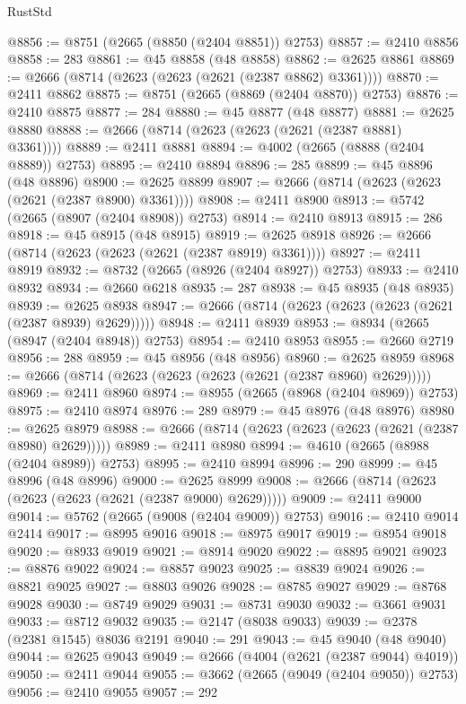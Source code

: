 \begin{lexlean}{RustStd}
\begin{coremodule}
@8856 := @8751 (@2665 (@8850 (@2404 @8851)) @2753)
@8857 := @2410 @8856
@8858 := 283
@8861 := @45 @8858 (@48 @8858)
@8862 := @2625 @8861
@8869 := @2666 (@8714 (@2623 (@2623 (@2621 (@2387 @8862) @3361))))
@8870 := @2411 @8862
@8875 := @8751 (@2665 (@8869 (@2404 @8870)) @2753)
@8876 := @2410 @8875
@8877 := 284
@8880 := @45 @8877 (@48 @8877)
@8881 := @2625 @8880
@8888 := @2666 (@8714 (@2623 (@2623 (@2621 (@2387 @8881) @3361))))
@8889 := @2411 @8881
@8894 := @4002 (@2665 (@8888 (@2404 @8889)) @2753)
@8895 := @2410 @8894
@8896 := 285
@8899 := @45 @8896 (@48 @8896)
@8900 := @2625 @8899
@8907 := @2666 (@8714 (@2623 (@2623 (@2621 (@2387 @8900) @3361))))
@8908 := @2411 @8900
@8913 := @5742 (@2665 (@8907 (@2404 @8908)) @2753)
@8914 := @2410 @8913
@8915 := 286
@8918 := @45 @8915 (@48 @8915)
@8919 := @2625 @8918
@8926 := @2666 (@8714 (@2623 (@2623 (@2621 (@2387 @8919) @3361))))
@8927 := @2411 @8919
@8932 := @8732 (@2665 (@8926 (@2404 @8927)) @2753)
@8933 := @2410 @8932
@8934 := @2660 @6218
@8935 := 287
@8938 := @45 @8935 (@48 @8935)
@8939 := @2625 @8938
@8947 := @2666 (@8714 (@2623 (@2623 (@2623 (@2621 (@2387 @8939) @2629)))))
@8948 := @2411 @8939
@8953 := @8934 (@2665 (@8947 (@2404 @8948)) @2753)
@8954 := @2410 @8953
@8955 := @2660 @2719
@8956 := 288
@8959 := @45 @8956 (@48 @8956)
@8960 := @2625 @8959
@8968 := @2666 (@8714 (@2623 (@2623 (@2623 (@2621 (@2387 @8960) @2629)))))
@8969 := @2411 @8960
@8974 := @8955 (@2665 (@8968 (@2404 @8969)) @2753)
@8975 := @2410 @8974
@8976 := 289
@8979 := @45 @8976 (@48 @8976)
@8980 := @2625 @8979
@8988 := @2666 (@8714 (@2623 (@2623 (@2623 (@2621 (@2387 @8980) @2629)))))
@8989 := @2411 @8980
@8994 := @4610 (@2665 (@8988 (@2404 @8989)) @2753)
@8995 := @2410 @8994
@8996 := 290
@8999 := @45 @8996 (@48 @8996)
@9000 := @2625 @8999
@9008 := @2666 (@8714 (@2623 (@2623 (@2623 (@2621 (@2387 @9000) @2629)))))
@9009 := @2411 @9000
@9014 := @5762 (@2665 (@9008 (@2404 @9009)) @2753)
@9016 := @2410 @9014 @2414
@9017 := @8995 @9016
@9018 := @8975 @9017
@9019 := @8954 @9018
@9020 := @8933 @9019
@9021 := @8914 @9020
@9022 := @8895 @9021
@9023 := @8876 @9022
@9024 := @8857 @9023
@9025 := @8839 @9024
@9026 := @8821 @9025
@9027 := @8803 @9026
@9028 := @8785 @9027
@9029 := @8768 @9028
@9030 := @8749 @9029
@9031 := @8731 @9030
@9032 := @3661 @9031
@9033 := @8712 @9032
@9035 := @2147 (@8038 @9033)
@9039 := @2378 (@2381 @1545) @8036 @2191
@9040 := 291
@9043 := @45 @9040 (@48 @9040)
@9044 := @2625 @9043
@9049 := @2666 (@4004 (@2621 (@2387 @9044) @4019))
@9050 := @2411 @9044
@9055 := @3662 (@2665 (@9049 (@2404 @9050)) @2753)
@9056 := @2410 @9055
@9057 := 292

\end{coremodule}
\end{lexlean}
